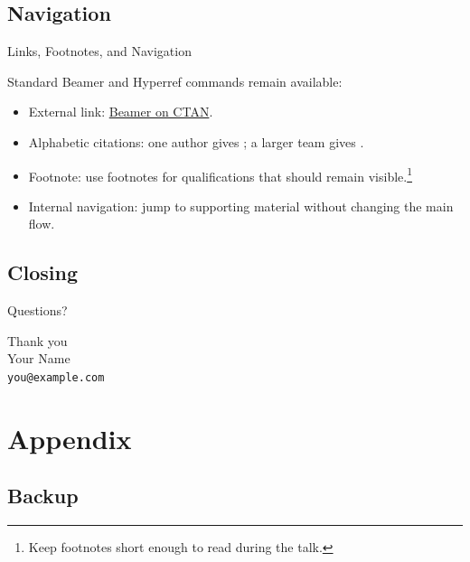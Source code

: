 \documentclass[10pt,aspectratio=169]{virgiling-slides}
\begin{document}
\subsection{Navigation}

\begin{frame}{Links, Footnotes, and Navigation}
  \hypertarget{navigation-demo}{}

  Standard Beamer and Hyperref commands remain available:
  \begin{itemize}
    \item External link: \href{https://ctan.org/pkg/beamer}{Beamer on CTAN}.
    \item Alphabetic citations: one author gives \cite{lamport1994latex}; a larger team gives \cite{vaswani2017attention}.
    \item Footnote: use footnotes for qualifications that should remain visible.\footnote{Keep footnotes short enough to read during the talk.}
    \item Internal navigation: jump to supporting material without changing the main flow.
  \end{itemize}

  \begin{center}
    \hyperlink{backup-demo}{}
  \end{center}
\end{frame}

\subsection{Closing}

\begin{frame}[c]{Questions?}
  \begin{center}
    \Large Thank you\\[0.8em]
    \normalsize
    Your Name\\
    \texttt{you@example.com}

    \bigskip
  \end{center}
\end{frame}

\appendix
\section{Appendix}

\subsection{Backup}
\end{document}
